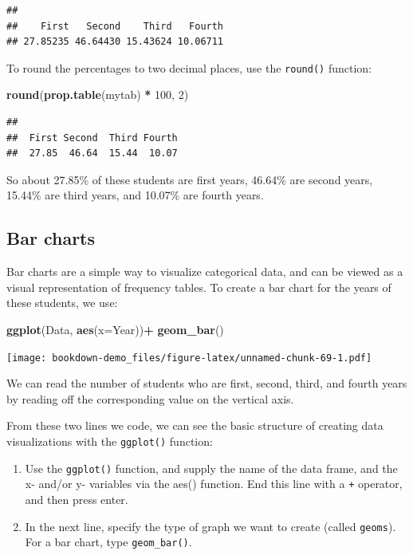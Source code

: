 \documentclass[
]{book}
\newenvironment{Shaded}{\begin{snugshade}}{\end{snugshade}}
\newcommand{\AttributeTok}[1]{\textcolor[rgb]{0.13,0.29,0.53}{#1}}
\newcommand{\DecValTok}[1]{\textcolor[rgb]{0.00,0.00,0.81}{#1}}
\newcommand{\FunctionTok}[1]{\textcolor[rgb]{0.13,0.29,0.53}{\textbf{#1}}}
\newcommand{\NormalTok}[1]{#1}
\newcommand{\SpecialCharTok}[1]{\textcolor[rgb]{0.81,0.36,0.00}{\textbf{#1}}}
\begin{document}
\begin{verbatim}
## 
##    First   Second    Third   Fourth 
## 27.85235 46.64430 15.43624 10.06711
\end{verbatim}

To round the percentages to two decimal places, use the \texttt{round()} function:

\begin{Shaded}
\begin{Highlighting}[]
\FunctionTok{round}\NormalTok{(}\FunctionTok{prop.table}\NormalTok{(mytab) }\SpecialCharTok{*} \DecValTok{100}\NormalTok{, }\DecValTok{2}\NormalTok{)}
\end{Highlighting}
\end{Shaded}

\begin{verbatim}
## 
##  First Second  Third Fourth 
##  27.85  46.64  15.44  10.07
\end{verbatim}

So about 27.85\% of these students are first years, 46.64\% are second years, 15.44\% are third years, and 10.07\% are fourth years.

\hypertarget{bar-charts}{%
\subsection{Bar charts}\label{bar-charts}}

Bar charts are a simple way to visualize categorical data, and can be viewed as a visual representation of frequency tables. To create a bar chart for the years of these students, we use:

\begin{Shaded}
\begin{Highlighting}[]
\FunctionTok{ggplot}\NormalTok{(Data, }\FunctionTok{aes}\NormalTok{(}\AttributeTok{x=}\NormalTok{Year))}\SpecialCharTok{+}
  \FunctionTok{geom\_bar}\NormalTok{()}
\end{Highlighting}
\end{Shaded}

\texttt{[image: bookdown-demo\_files/figure-latex/unnamed-chunk-69-1.pdf]}

We can read the number of students who are first, second, third, and fourth years by reading off the corresponding value on the vertical axis.

From these two lines we code, we can see the basic structure of creating data visualizations with the \texttt{ggplot()} function:

\begin{enumerate}
\def\labelenumi{\arabic{enumi}.}
\item
  Use the \texttt{ggplot()} function, and supply the name of the data frame, and the x- and/or y- variables via the aes() function. End this line with a \texttt{+} operator, and then press enter.
\item
  In the next line, specify the type of graph we want to create (called \texttt{geoms}). For a bar chart, type \texttt{geom\_bar()}.
\end{enumerate}
\end{document}
